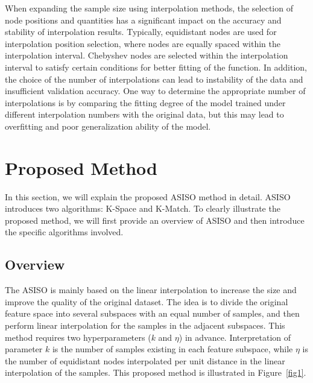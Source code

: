 \documentclass[sn-mathphys,Numbered]{sn-jnl}%
\theoremstyle{thmstyleone}%
\theoremstyle{thmstyletwo}%
\theoremstyle{thmstylethree}%
\begin{document}
When expanding the sample size using interpolation methods, the selection of node positions and quantities has a significant impact on the accuracy and stability of interpolation results. Typically, equidistant nodes \cite{bib21} are used for interpolation position selection, where nodes are equally spaced within the interpolation interval. Chebyshev nodes \cite{bib22} are selected within the interpolation interval to satisfy certain conditions for better fitting of the function. In addition, the choice of the number of interpolations can lead to instability of the data and insufficient validation accuracy. One way to determine the appropriate number of interpolations is by comparing the fitting degree of the model trained under different interpolation numbers with the original data, but this may lead to overfitting and poor generalization ability of the model.

\section{Proposed Method}\label{sec3}

In this section, we will explain the proposed ASISO method in detail. ASISO introduces two algorithms: K-Space and K-Match. To clearly illustrate the proposed method, we will first provide an overview of ASISO and then introduce the specific algorithms involved. 

\subsection{Overview}\label{subsec1}

The ASISO is mainly based on the linear interpolation to increase the size and improve the quality of the original dataset. The idea is to divide the original feature space into several subspaces with an equal number of samples, and then perform linear interpolation for the samples in the adjacent subspaces. This method requires two hyperparameters ($k$ and $\eta$) in advance. Interpretation of parameter $k$ is the number of samples existing in each feature subspace, while $\eta$ is the number of equidistant nodes interpolated per unit distance in the linear interpolation of the samples. This proposed method is illustrated in Figure~\ref{fig1}.
\end{document}
